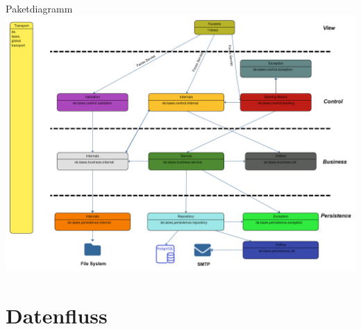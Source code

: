 \documentclass{beamer}
\begin{document}
    \begin{frame}{Paketdiagramm}
        \centering
        \includegraphics[height=0.8\textheight]{graphics/Paketdiagramm (15)}
    \end{frame}


    \section{Datenfluss}
\end{document}
